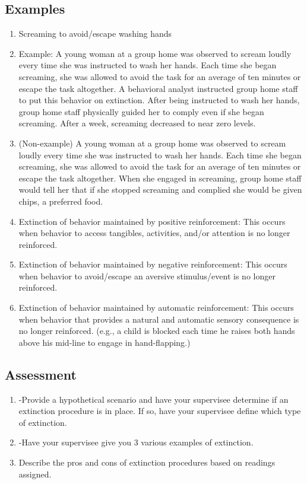 \subsection{Examples}
\begin{enumerate}
\item Screaming to avoid/escape washing hands
\item Example: A young woman at a group home was observed to scream loudly every time she was instructed to wash her hands. Each time she began screaming, she was allowed to avoid the task for an average of ten minutes or escape the task altogether. A behavioral analyst instructed group home staff to put this behavior on extinction.  After being instructed to wash her hands, group home staff physically guided her to comply even if she began screaming. After a week, screaming decreased to near zero levels.
\item (Non-example) A young woman at a group home was observed to scream loudly every time she was instructed to wash her hands. Each time she began screaming, she was allowed to avoid the task for an average of ten minutes or escape the task altogether. When she engaged in screaming, group home staff would tell her that if she stopped screaming and complied she would be given chips, a preferred food.
\item Extinction of behavior maintained by positive reinforcement: This occurs when behavior to access tangibles, activities, and/or attention is no longer reinforced. 
\item Extinction of behavior maintained by negative reinforcement: This occurs when behavior to avoid/escape an aversive stimulus/event is no longer reinforced. 
\item Extinction of behavior maintained by automatic reinforcement: This occurs when behavior that provides a natural and automatic sensory consequence is no longer reinforced. (e.g., a child is blocked each time he raises both hands above his mid-line to engage in hand-flapping.) 
%
\end{enumerate}
%
\subsection{Assessment}
\begin{enumerate}
\item -Provide a hypothetical scenario and have your supervisee determine if an extinction procedure is in place. If so, have your supervisee define which type of extinction.
\item -Have your supervisee give you 3 various examples of extinction. 
\item Describe the pros and cons of extinction procedures based on readings assigned.
%
\end{enumerate}
%

